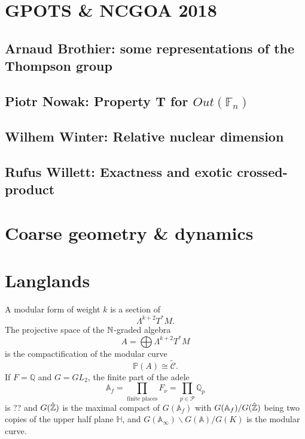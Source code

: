 \section{GPOTS \& NCGOA 2018}

\subsection{Arnaud Brothier: some representations of the Thompson group}

\subsection{Piotr Nowak: Property T for $Out(\mathbb F_n)$}

\subsection{Wilhem Winter: Relative nuclear dimension}

\subsection{Rufus Willett: Exactness and exotic crossed-product}

\section{Coarse geometry \& dynamics}

\section{Langlands}   %

A modular form of weight $k$ is a section of 
\[\Lambda^{k+2}T^*M.\]
The projective space of the $\mathbb N$-graded algebra \[A=\bigoplus \Lambda^{k+2}T^*M\] is the compactification of the modular curve
\[\mathbb P(A) \cong \tilde{\mathcal C}.\]
If $F=\mathbb Q$ and $G= GL_2$, the finite part of the adele
\[\mathbb A_f = \prod_{\text{finite places}} F_\nu = \prod_{p \in \mathcal P} \mathbb Q_p\]
is ?? and $G(\hat{\mathbb Z})$ is the maximal compact of $G(\mathbb A_f)$ with $G(\mathbb A_f ) / G(\hat {\mathbb Z})$ being two copies of the upper half plane $\mathbb H$, and $G(\mathbb A_\infty) \backslash G(\mathbb A) / G(K)$ is the modular curve.\\

